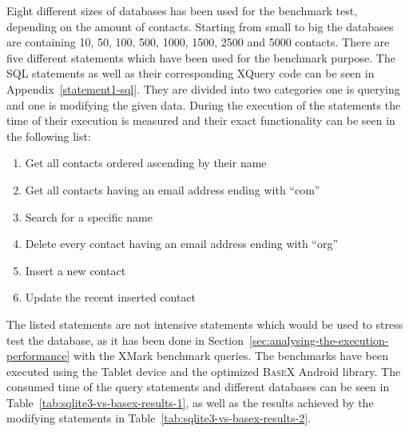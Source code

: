 Eight different sizes of databases has been used for the benchmark test, depending on the amount of contacts.
Starting from small to big the databases are containing 10, 50, 100, 500, 1000, 1500, 2500 and 5000 contacts.
There are five different statements which have been used for the benchmark purpose.
The SQL statements as well as their corresponding XQuery code can be seen in Appendix~\ref{statement1-sql}.
They are divided into  two categories one is querying and one is modifying the given data.
During the execution of the statements the time of their execution is measured and their exact functionality can be seen in the following list:
\begin{enumerate}
	\item Get all contacts ordered ascending by their name
	\item Get all contacts having an email address ending with ``com''
	\item Search for a specific name
	\item Delete every contact having an email address ending with ``org''
	\item Insert a new contact
	\item Update the recent inserted contact
\end{enumerate}
The listed statements are not intensive statements which would be used to stress test the database, as it has been done in Section~\ref{sec:analysing-the-execution-performance} with the XMark benchmark queries.
The benchmarks have been executed using the Tablet device and the optimized \textsc{BaseX} Android library.
The consumed time of the query statements and different databases can be seen in Table~\ref{tab:sqlite3-vs-basex-results-1}, as well as the results achieved by the modifying statements in Table~\ref{tab:sqlite3-vs-basex-results-2}.


